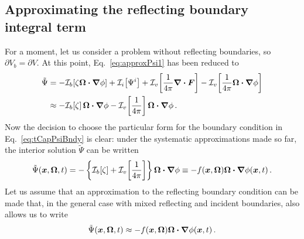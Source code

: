 \subsection{Approximating the reflecting boundary integral term}\label{sec:derReflBc}
For a moment, let us consider a problem without reflecting boundaries, so
$\partial V_b = \partial V$. At this point, Eq.~\eqref{eq:approxPsi1} has been
reduced to
\begin{align*}
  \tilde\Psi
  &= -\mathcal{I}_{b}\!\left[\zeta \bm{\Omega}\bm{\cdot} \bm{\nabla} \phi\right]
    + \mathcal{I}_{i}\!\left[\Psi^i\right]
    + \mathcal{I}_{v}\!\left[\frac{1}{4\pi} \bm{\nabla} \bm{\cdot}\bm{F} \right]
    - \mathcal{I}_{v}\!\left[\frac{1}{4\pi} \bm{\Omega}\bm{\cdot} \bm{\nabla} \phi\right]
\\
  &\approx
  -\mathcal{I}_{b}\!\left[\zeta\right] \bm{\Omega}\bm{\cdot} \bm{\nabla} \phi
  - \mathcal{I}_{v}\!\left[\frac{1}{4\pi}\right] \bm{\Omega}\bm{\cdot} \bm{\nabla} \phi \,.
\end{align*}
Now the decision to choose the particular form for the boundary condition in
Eq.~\eqref{eq:tCapPsiBndy}
is clear: under the systematic approximations made so far, the interior solution
$\tilde\Psi$ can be written
\begin{equation*}
  \tilde\Psi(\bm{x}, \bm{\Omega}, t)
  = - \left\{ \mathcal{I}_{b}\!\left[\zeta\right] + \mathcal{I}_{v}\!\left[\frac{1}{4\pi}\right]
  \right\} \bm{\Omega}\bm{\cdot} \bm{\nabla} \phi
  \equiv - f(\bm{x}, \bm{\Omega}) \bm{\Omega}\bm{\cdot} \bm{\nabla} \phi(\bm{x}, t)\,.
\end{equation*}
Let us assume that an approximation to the reflecting boundary condition can
be made that, in the general case with mixed reflecting and incident
boundaries, also allows us to write 
\begin{equation*}
  \tilde\Psi(\bm{x}, \bm{\Omega}, t)
  \approx - f(\bm{x}, \bm{\Omega}) \bm{\Omega}\bm{\cdot} \bm{\nabla} \phi(\bm{x}, t)\,.
\end{equation*}

